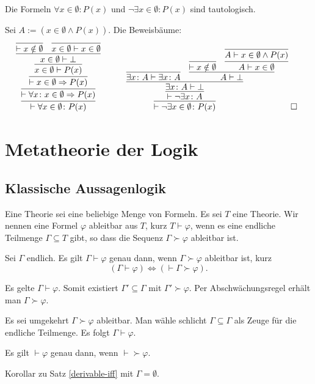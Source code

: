 \newpage
\begin{Satz}\newlinefirst
Die Formeln $\forall x\in\emptyset\colon P(x)$ und $\neg\exists x\in\emptyset\colon P(x)$
sind tautologisch.
\end{Satz}
\begin{Beweis}
Sei $A:=(x\in\emptyset\land P(x))$. Die Beweisbäume:
\[
\begin{array}{@{}l@{\qquad\quad}l}
\infer{\vdash\forall x\in\emptyset\colon P(x)}{
  \infer{\vdash\forall x\colon x\in\emptyset\Rightarrow P(x)}{
    \infer{\vdash x\in\emptyset\Rightarrow P(x)}{
      \infer{x\in\emptyset\vdash P(x)}{
        \infer{x\in\emptyset\vdash\bot}{
          \infer{\vdash x\notin\emptyset}{}
        & \infer{x\in\emptyset\vdash x\in\emptyset}{}}}}}}
&
\infer{\vdash\neg\exists x\in\emptyset\colon P(x)}{
  \infer{\vdash\neg\exists x\colon A}{
    \infer{\exists x\colon A\vdash\bot}{
      \infer{\exists x\colon A\vdash\exists x\colon A}{}
    & \infer{A\vdash\bot}{
        \infer{\vdash x\notin\emptyset}{}
      & \infer{A\vdash x\in\emptyset}{
          \infer{A\vdash x\in\emptyset\land P(x)}{}}}}}}\;\qedsymbol
\end{array}
\]
\end{Beweis}

\section{Metatheorie der Logik}
\subsection{Klassische Aussagenlogik}

\begin{Definition}\newlinefirst
Eine Theorie sei eine beliebige Menge von Formeln.
Es sei $T$ eine Theorie. Wir nennen eine Formel $\varphi$ ableitbar aus
$T$, kurz $T\vdash\varphi$, wenn es eine endliche Teilmenge
$\Gamma\subseteq T$ gibt, so dass die Sequenz $\Gamma\succ\varphi$
ableitbar ist.
\end{Definition}
\begin{Satz}\label{derivable-iff}
Sei $\Gamma$ endlich. Es gilt $\Gamma\vdash\varphi$ genau dann,
wenn $\Gamma\succ\varphi$ ableitbar ist, kurz
\[(\Gamma\vdash\varphi) \iff (\vdash \Gamma\succ\varphi).\]
\end{Satz}
\begin{Beweis}
Es gelte $\Gamma\vdash\varphi$. Somit existiert
$\Gamma'\subseteq\Gamma$ mit $\Gamma'\succ\varphi$.
Per Abschwächungsregel erhält man $\Gamma\succ\varphi$.

Es sei umgekehrt $\Gamma\succ\varphi$ ableitbar. Man wähle schlicht
$\Gamma\subseteq\Gamma$ als Zeuge für die endliche Teilmenge.
Es folgt $\Gamma\vdash\varphi$.\,\qedsymbol
\end{Beweis}
\begin{Satz}
Es gilt $\vdash\varphi$ genau dann, wenn $\vdash\succ\varphi$.
\end{Satz}
\begin{Beweis}
Korollar zu Satz \ref{derivable-iff} mit $\Gamma=\emptyset$.
\end{Beweis}

